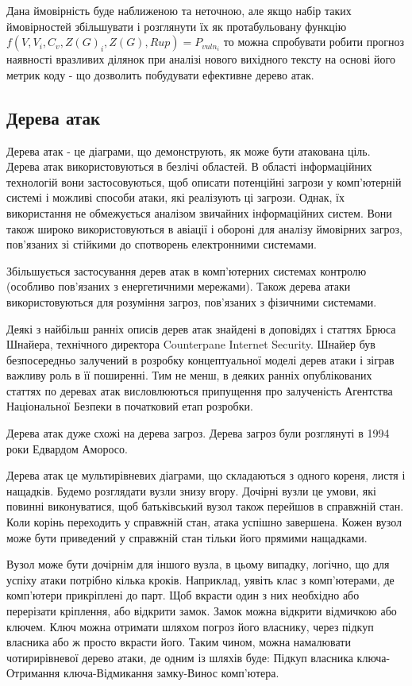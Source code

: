 Дана ймовірність буде наближеною та неточною, але якщо набір таких ймовірностей збільшувати і розглянути їх як протабульовану функцію
$f(V,V_i,C_v,Z(G)_i,Z(G),Rup) = P_{vuln_i}$
то можна спробувати робити прогноз наявності вразливих ділянок при аналізі нового вихідного тексту на основі  його метрик коду - що дозволить побудувати ефективне дерево атак.


\subsection{Дерева атак}
\label{2section:id14}
Дерева атак - це діаграми, що демонструють, як може бути атакована ціль. Дерева атак використовуються в безлічі областей. В області інформаційних технологій вони застосовуються, щоб описати потенційні загрози  у комп'ютерній системі і можливі способи атаки, які реалізують ці загрози. Однак, їх використання не обмежується аналізом звичайних інформаційних систем. Вони також широко використовуються в авіації і обороні для аналізу ймовірних загроз, пов'язаних зі стійкими до спотворень електронними системами.

Збільшується застосування дерев атак в комп'ютерних системах контролю (особливо пов'язаних з енергетичними мережами). Також дерева атаки використовуються для розуміння загроз, пов'язаних з фізичними системами.

Деякі з найбільш ранніх описів дерев атак знайдені в доповідях і статтях Брюса Шнайера, технічного директора Counterpane Internet Security. Шнайер був безпосередньо залучений в розробку концептуальної моделі дерев атаки і зіграв важливу роль в її поширенні. Тим не менш, в деяких ранніх опублікованих статтях по деревах атак висловлюються припущення про залученість Агентства Національної Безпеки в початковий етап розробки.

Дерева атак дуже схожі на дерева загроз. Дерева загроз були розглянуті в 1994 роки Едвардом Аморосо.

Дерева атак це мультирівневих діаграми, що складаються з одного кореня, листя і нащадків. Будемо розглядати вузли знизу вгору. Дочірні вузли це умови, які повинні виконуватися, щоб батьківський вузол також перейшов в справжній стан. Коли корінь переходить у справжній стан, атака успішно завершена. Кожен вузол може бути приведений у справжній стан тільки його прямими нащадками.

Вузол може бути дочірнім для іншого вузла, в цьому випадку, логічно, що для успіху атаки потрібно кілька кроків. Наприклад, уявіть клас з комп'ютерами, де комп'ютери прикріплені до парт. Щоб вкрасти один з них необхідно або перерізати кріплення, або відкрити замок. Замок можна відкрити відмичкою або ключем. Ключ можна отримати шляхом погроз його власнику, через підкуп власника або ж просто вкрасти його. Таким чином, можна намалювати чотирирівневої дерево атаки, де одним із шляхів буде: Підкуп власника ключа-Отримання ключа-Відмикання замку-Винос комп'ютера.

